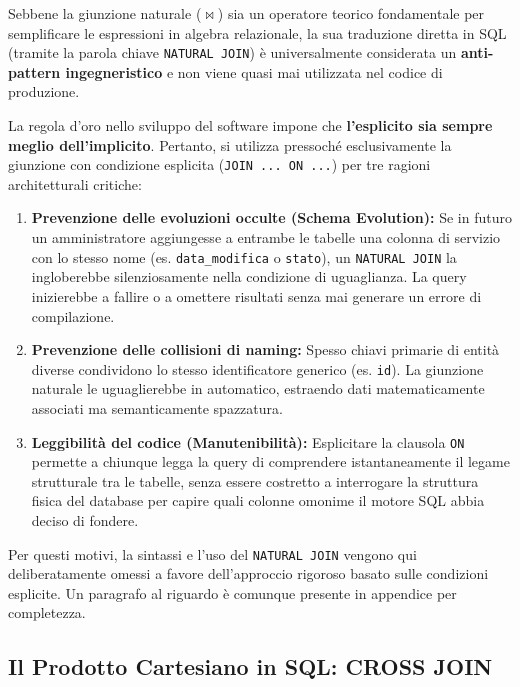 \begin{bestpractice}
Sebbene la giunzione naturale ($\bowtie$) sia un operatore teorico fondamentale per semplificare le espressioni in algebra relazionale, la sua traduzione diretta in SQL (tramite la parola chiave \texttt{NATURAL JOIN}) è universalmente considerata un \textbf{anti-pattern ingegneristico} e non viene quasi mai utilizzata nel codice di produzione.

La regola d'oro nello sviluppo del software impone che \textbf{l'esplicito sia sempre meglio dell'implicito}. Pertanto, si utilizza pressoché esclusivamente la giunzione con condizione esplicita (\texttt{JOIN ... ON ...}) per tre ragioni architetturali critiche:
\begin{enumerate}
    \item \textbf{Prevenzione delle evoluzioni occulte (Schema Evolution):} Se in futuro un amministratore aggiungesse a entrambe le tabelle una colonna di servizio con lo stesso nome (es. \texttt{data\_modifica} o \texttt{stato}), un \texttt{NATURAL JOIN} la ingloberebbe silenziosamente nella condizione di uguaglianza. La query inizierebbe a fallire o a omettere risultati senza mai generare un errore di compilazione.
    \item \textbf{Prevenzione delle collisioni di naming:} Spesso chiavi primarie di entità diverse condividono lo stesso identificatore generico (es. \texttt{id}). La giunzione naturale le uguaglierebbe in automatico, estraendo dati matematicamente associati ma semanticamente spazzatura.
    \item \textbf{Leggibilità del codice (Manutenibilità):} Esplicitare la clausola \texttt{ON} permette a chiunque legga la query di comprendere istantaneamente il legame strutturale tra le tabelle, senza essere costretto a interrogare la struttura fisica del database per capire quali colonne omonime il motore SQL abbia deciso di fondere.
\end{enumerate}
Per questi motivi, la sintassi e l'uso del \texttt{NATURAL JOIN} vengono qui deliberatamente omessi a favore dell'approccio rigoroso basato sulle condizioni esplicite. Un paragrafo al riguardo è comunque presente in appendice per completezza. 
\end{bestpractice}

\subsection{Il Prodotto Cartesiano in SQL: CROSS JOIN}

